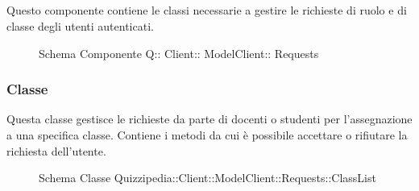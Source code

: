 \subsection{}
Questo componente contiene le classi necessarie a gestire le richieste di ruolo e di classe degli utenti autenticati.
\begin{figure}[H]
\centering
\noindent{}
\caption[Schema Componente Quizzipedia::Client::ModelClient::Requests]{Schema Componente Q:: Client:: ModelClient:: Requests}
\end{figure}
\subsubsection{Classe }
Questa classe gestisce le richieste da parte di docenti o studenti per l'assegnazione a una specifica classe. Contiene i metodi da cui è possibile accettare o rifiutare la richiesta dell'utente.
\begin{figure}[H]
\centering
\noindent{}
\caption[Schema Classe ClassList]{Schema Classe Quizzipedia::Client::ModelClient::Requests::ClassList}
\end{figure}

